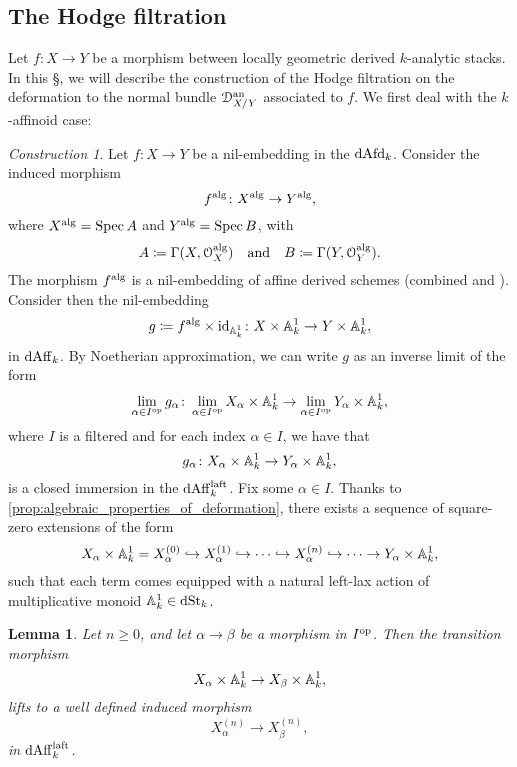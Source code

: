 \documentclass[10pt,a4paper,reqno]{amsart} %
\theoremstyle{plain}
\newtheorem{lem}[thm]{Lemma}
\theoremstyle{definition}
\theoremstyle{remark}
\numberwithin{equation}{section}
\newtheorem{construction}[thm]{Construction}
\begin{document}
\subsection{The Hodge filtration} Let $f \colon X \to Y$ be a morphism between locally geometric derived $k$-analytic stacks.
In this \S, we will describe the construction of the Hodge filtration on the deformation to the normal bundle $\mathcal D_{X/ Y}^\mathrm{an}$ associated to $f$.
We first deal with the $k$-affinoid case:


\begin{construction} \label{const:construction_of_Hodge_filtration_in_the_lafp_case}
    Let $f \colon X \to Y$ be a nil-embedding in the \infcat $\mathrm{dAfd}_k$.
    Consider the induced morphism
        \[
            f ^\mathrm{alg} \colon X^\mathrm{alg} \to Y^\mathrm{alg},   
        \]
    where $X ^\mathrm{alg} = \operatorname{Spec} A$ and $Y^\mathrm{alg} = \operatorname{Spec} B$, with
    \[A \coloneqq \Gamma(X, \mathcal O_X^\mathrm{alg}) \quad \mathrm{and} \quad B \coloneqq \Gamma(Y, \mathcal O_Y ^\mathrm{alg}).\]
    The morphism $f^\mathrm{alg}$ is a nil-embedding of affine derived schemes (combined \cite[Lemma 6.9]{Porta_Yu_NQK} and
    \cite[Proposition 3.17]{Porta_Yu_Derived_non-archimedean_analytic_spaces}). Consider then the nil-embedding
        \[
            g \coloneqq f ^\mathrm{alg} \times \mathrm{id}_{\mathbb A^1_k} \colon X \times \mathbb A^1_k \to Y \times \mathbb A^1_k,  
        \]
    in $\mathrm{dAff}_k$. By Noetherian approximation, we can write $g$ as an inverse limit of the form
        \[
            \lim_{\alpha \in I ^\mathrm{op}}  g_\alpha \colon \lim_{\alpha \in I ^\mathrm{op}} X_\alpha \times \mathbb A^1_k \to \lim_{\alpha \in I ^\mathrm{op}} Y_\alpha \times \mathbb A^1_k,  
        \]
    where $I$ is a filtered \infcat and for each index $\alpha \in I$, we have that
        \[
            g_\alpha \colon X_\alpha \times \mathbb A^1_k \to Y_\alpha \times \mathbb A^1_k,  
        \]
    is a closed immersion in the \infcat $\mathrm{dAff}_k^{\mathrm{laft}}$. Fix some $\alpha \in I$. Thanks to \cref{prop:algebraic_properties_of_deformation},
    there exists a sequence of square-zero extensions of the form
        \[
            X_\alpha \times \mathbb A^1_k = X^{(0)}_\alpha \hookrightarrow X_\alpha^{(1)} \hookrightarrow \dots \hookrightarrow X_\alpha^{(n)} \hookrightarrow \dots \to Y_\alpha \times \mathbb A^1_k,  
        \]
    such that each term comes equipped with a natural left-lax action of multiplicative monoid $\mathbb A^1_k \in \mathrm{dSt}_k$.
\end{construction}

\begin{lem} \label{lem:naturality_of_Hodge_filtration_w.r.t_Noetherian_approximation}
    Let  $n \ge 0$, and let $\alpha \to \beta$ be a morphism in $I ^\mathrm{op}$. Then the transition morphism
        \[
            X_\alpha \times \mathbb A^1_k \to X_\beta \times \mathbb A^1_k,  
        \]
    lifts to a well defined induced morphism
        \[
            X_\alpha^{(n)} \to X_\beta^{(n)},
        \]
    in $\mathrm{dAff}_k^{\mathrm{laft}}$.
\end{lem}
\end{document}
